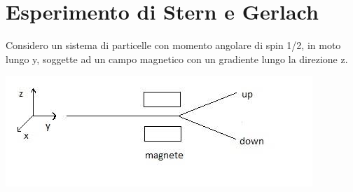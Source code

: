\section{Esperimento di Stern e Gerlach} %
Considero un sistema di particelle con momento angolare di spin 1/2, in moto lungo y, soggette ad un campo magnetico con un gradiente lungo la direzione z.
\begin{center}
\includegraphics[scale=0.5]{immagini/stern-gerlach.jpg} %
\end{center}


